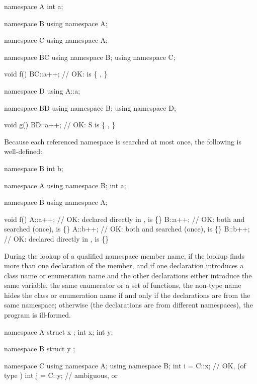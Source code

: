 \begin{codeblock}
namespace A {
  int a;
}

namespace B {
  using namespace A;
}

namespace C {
  using namespace A;
}

namespace BC {
  using namespace B;
  using namespace C;
}

void f()
{
  BC::a++;          // OK:  is \{ ,  \}
}

namespace D {
  using A::a;
}

namespace BD {
  using namespace B;
  using namespace D;
}

void g()
{
  BD::a++;          // OK: S is \{ ,  \}
}
\end{codeblock}

\pnum
Because each referenced namespace is searched at most once, the
following is well-defined:

\begin{codeblock}
namespace B {
  int b;
}

namespace A {
  using namespace B;
  int a;
}

namespace B {
  using namespace A;
}

void f()
{
  A::a++;           // OK:  declared directly in ,  is \{\}
  B::a++;           // OK: both  and  searched (once),  is \{\}
  A::b++;           // OK: both  and  searched (once),  is \{\}
  B::b++;           // OK:  declared directly in ,  is \{\}
}
\end{codeblock}
\exitexample 

\pnum
During the lookup of a qualified namespace member name, if the lookup
finds more than one declaration of the member, and if one declaration
introduces a class name or enumeration name and the other declarations
either introduce the same variable, the same enumerator or a set of
functions, the non-type name hides the class or enumeration name if and
only if the declarations are from the same namespace; otherwise (the
declarations are from different namespaces), the program is ill-formed.
\enterexample

\begin{codeblock}
namespace A {
  struct x { };
  int x;
  int y;
}

namespace B {
  struct y { };
}

namespace C {
  using namespace A;
  using namespace B;
  int i = C::x;     // OK,  (of type  )
  int j = C::y;     // ambiguous,  or 
}
\end{codeblock}
\exitexample 

